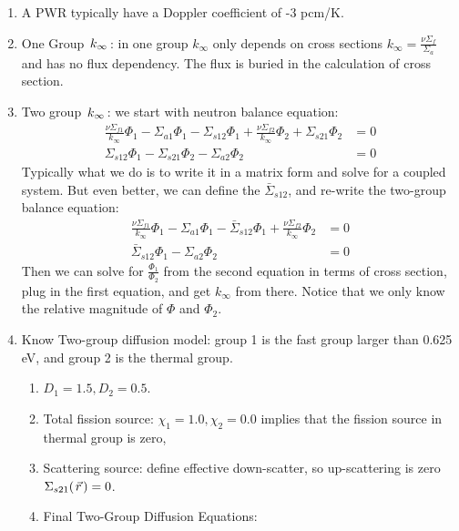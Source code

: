 \documentclass{school-22.211-notes}
\begin{document}
\clearpage
{} 
\begin{enumerate}
\item A PWR typically have a Doppler coefficient of -3 pcm/K. 

\item One Group $\left. k_{\infty} \right.$: in one group $k_{\infty}$ only depends on cross sections $k_{\infty} = \frac{\nu \Sigma_f}{\Sigma_a}$ and has no flux dependency. The flux is buried in the calculation of cross section.

\item Two group $\left. k_{\infty} \right.$: we start with neutron balance equation:
  \begin{align}
    \frac{\nu \Sigma_{f1}}{k_{\infty}} \Phi_1 - \Sigma_{a1} \Phi_1 - \Sigma_{s12} \Phi_1 + \frac{\nu \Sigma_{f2}}{k_{\infty}} \Phi_2 + \Sigma_{s21} \Phi_2 &= 0 \\
\Sigma_{s12} \Phi_1 - \Sigma_{s21} \Phi_2 - \Sigma_{a2} \Phi_2 &= 0 
  \end{align}
  Typically what we do is to write it in a matrix form and solve for a coupled system. But even better, we can define the  $\bar{\Sigma}_{s12}$, and re-write the two-group balance equation: 
  \begin{align}
    \frac{\nu \Sigma_{f1}}{k_{\infty}} \Phi_1 - \Sigma_{a1} \Phi_1 - \bar{\Sigma}_{s12} \Phi_1 + \frac{\nu \Sigma_{f2}}{k_{\infty}} \Phi_2 &= 0 \\
    \bar{\Sigma}_{s12} \Phi_1- \Sigma_{a2} \Phi_2 &= 0 
  \end{align}
  Then we can solve for $\frac{\Phi_1}{\Phi_2}$ from the second equation in terms of cross section, plug in the first equation, and get $k_{\infty}$ from there. Notice that we only know the relative magnitude of $\Phi$ and $\Phi_2$. 

\item Know Two-group diffusion model: group 1 is the fast group larger than 0.625 eV, and group 2 is the thermal group. 
\begin{enumerate}
\item $D_1 = 1.5, D_2 = 0.5$.
\item Total fission source: $\chi_1 = 1.0, \chi_2 = 0.0$ implies that the fission source in thermal group is zero,
\item Scattering source: define effective down-scatter, so up-scattering is zero $\Sigma_{s21} (\left.\vec{r}\right.) = 0$. 
\item Final Two-Group Diffusion Equations: 
\end{enumerate}


\end{enumerate}
\end{document}
